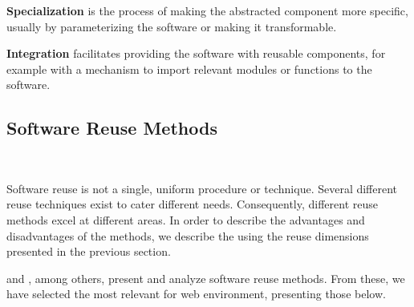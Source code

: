 \textbf{Specialization} is the process of making the abstracted component more specific, usually by parameterizing the software or making it transformable.\newline

\textbf{Integration} facilitates providing the software with reusable components, for example with a mechanism to import relevant modules or functions to the software.\newline


\subsection{Software Reuse Methods}



~

Software reuse is not a single, uniform procedure or technique. Several different reuse techniques exist to cater different needs. Consequently, different reuse methods excel at different areas. In order to describe the advantages and disadvantages of the methods, we describe the using the reuse dimensions presented in the previous section.

\citet{krueger_software_1992} and \citet{johnson_frameworkscomponents+_1997}, among others, present and analyze software reuse methods. From these, we have selected the most relevant for web environment, presenting those below.


